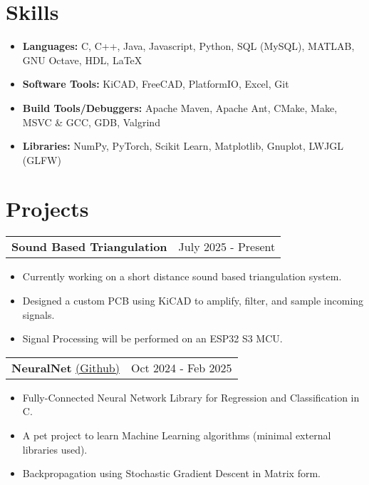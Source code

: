 \documentclass{article}
\begin{document}
\section{Skills} \vspace{4pt}
    \begin{itemize}
        \setlength{\itemsep}{-2pt}
        \item {\bf Languages:} C, C++, Java, Javascript, Python, SQL (MySQL), MATLAB, GNU Octave, HDL, \LaTeX
        \item {\bf Software Tools:} KiCAD, FreeCAD, PlatformIO, Excel, Git
        \item {\bf Build Tools/Debuggers:} Apache Maven, Apache Ant, CMake, Make, MSVC \& GCC, GDB, Valgrind
	\item {\bf Libraries:} NumPy, PyTorch, Scikit Learn, Matplotlib, Gnuplot, LWJGL (GLFW)
    \end{itemize}

\section{Projects}
    \raggedright\begin{tabular}{lr}
        \parbox[l]{3.65in}{\bf{\large{Sound Based Triangulation}}} &
        \parbox[r]{3.65in}{\raggedleft July 2025 - Present} \\
    \end{tabular}
    \begin{itemize} \vspace{-5pt}
        \item Currently working on a short distance sound based triangulation system.
        \item Designed a custom PCB using KiCAD to amplify, filter, and sample incoming signals.
        \item Signal Processing will be performed on an ESP32 S3 MCU.
    \end{itemize}

    \raggedright\begin{tabular}{lr}
        \parbox[l]{3.65in}{{\bf{\large{NeuralNet}}} \href{https://github.com/avr34/NeuralNet}{(\underline{Github})}} &
        \parbox[r]{3.65in}{\raggedleft Oct 2024 - Feb 2025} \\
    \end{tabular}
    \begin{itemize} \vspace{-5pt}
        \setlength{\itemsep}{-2pt}
        \item Fully-Connected Neural Network Library for Regression and Classification in C.
        \item A pet project to learn Machine Learning algorithms (minimal external libraries used).
        \item Backpropagation using Stochastic Gradient Descent in Matrix form.
    \end{itemize}
\end{document}
